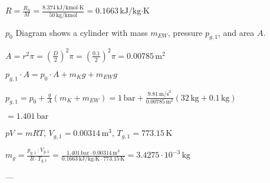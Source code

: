 \( R = \frac{R_u}{M} = \frac{8.374 \, \text{kJ}/\text{kmol·K}}{50 \, \text{kg/kmol}} = 0.1663 \, \text{kJ}/\text{kg·K} \)  

\( p_0 \)  
Diagram shows a cylinder with mass \( m_{EW} \), pressure \( p_{g,1} \), and area \( A \).  

\( A = r^2 \pi = \left(\frac{D}{2}\right)^2 \pi = \left(\frac{0.1}{2}\right)^2 \pi = 0.00785 \, \text{m}^2 \)  

\( p_{g,1} \cdot A = p_0 \cdot A + m_K g + m_{EW} g \)  

\( p_{g,1} = p_0 + \frac{g}{A} (m_K + m_{EW}) = 1 \, \text{bar} + \frac{9.81 \, \text{m/s}^2}{0.00785 \, \text{m}^2} (32 \, \text{kg} + 0.1 \, \text{kg}) \)  

\( = 1.401 \, \text{bar} \)  

\( pV = mRT \), \( V_{g,1} = 0.00314 \, \text{m}^3 \), \( T_{g,1} = 773.15 \, \text{K} \)  

\( m_g = \frac{p_{g,1} \cdot V_{g,1}}{R \cdot T_{g,1}} = \frac{1.401 \, \text{bar} \cdot 0.00314 \, \text{m}^3}{0.1663 \, \text{kJ}/\text{kg·K} \cdot 773.15 \, \text{K}} = 3.4275 \cdot 10^{-3} \, \text{kg} \)  

---